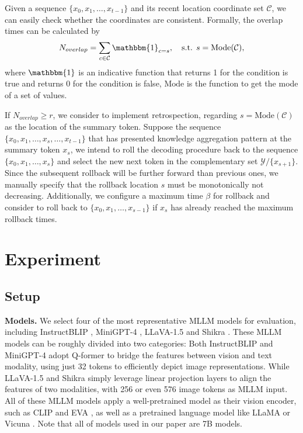 \documentclass[10pt,twocolumn,letterpaper]{article}
\begin{document}
Given a sequence $\{x_0,x_1,\ldots,x_{t-1}\}$ and its recent location coordinate set $\mathcal{C}$, we can easily check whether the coordinates are consistent. 
Formally, the overlap times can be calculated by
\begin{equation}
    N_{overlap} = \mathop{\sum}_{c\in\mathcal{C}} \mathbbm{1}_{c=s},\quad\text{s.t. }s=\text{Mode}(\mathcal{C}),
\end{equation}
where $\mathbbm{1}$ is an indicative function that returns 1 for the condition is true and returns 0 for the condition is false, $\text{Mode}$ is the function to get the mode of a set of values. 

If $N_{overlap}\geq r$, we consider to implement retrospection, regarding $s=\text{Mode}(\mathcal{C})$ as the location of the summary token. 
Suppose the sequence $\{x_0,x_1,\ldots,x_s,\ldots,x_{t-1}\}$ that has presented knowledge aggregation pattern at the summary token $x_s$, we intend to roll the decoding procedure back to the sequence $\{x_0,x_1,\ldots,x_s\}$ and select the new next token in the complementary set $\mathcal{Y}/\{x_{s+1}\}$. 
Since the subsequent rollback will be further forward than previous ones, we manually specify that the rollback location $s$ must be monotonically not decreasing. 
Additionally, we configure a maximum time $\beta$ for rollback and consider to roll back to $\{x_0,x_1,\ldots,x_{s-1}\}$ if $x_s$ has already reached the maximum rollback times. 







\section{Experiment}

\subsection{Setup}

\noindent\textbf{Models.}
We select four of the most representative MLLM models for evaluation, including InstructBLIP \cite{instructblip}, MiniGPT-4 \cite{zhu2023minigpt}, LLaVA-1.5 \cite{liu2023improvedllava} and Shikra \cite{chen2023shikra}. 
These MLLM models can be roughly divided into two categories: 
Both InstructBLIP and MiniGPT-4 adopt Q-former \cite{li2023blip} to bridge the features between vision and text modality, using just 32 tokens to efficiently depict image representations. 
While LLaVA-1.5 and Shikra simply leverage linear projection layers to align the features of two modalities, with 256 or even 576 image tokens as MLLM input. 
All of these MLLM models apply a well-pretrained model as their vision encoder, such as CLIP \cite{radford2021clip} and EVA \cite{fang2023eva}, as well as a pretrained language model like LLaMA \cite{touvron2023llama} or Vicuna \cite{chiang2023vicuna}. 
Note that all of models used in our paper are 7B models.
\end{document}
